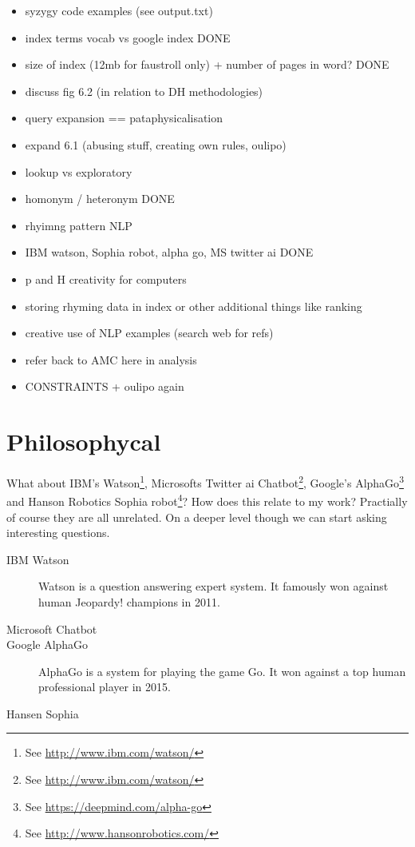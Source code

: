 \begin{itemize}
  \item syzygy code examples (see output.txt)
  \item index terms vocab vs google index DONE
  \item size of index (12mb for faustroll only) + number of pages in word? DONE
  \item discuss fig 6.2 (in relation to DH methodologies)
  \item query expansion == pataphysicalisation
  \item expand 6.1 (abusing stuff, creating own rules, oulipo)
  \item lookup vs exploratory
  \item homonym / heteronym DONE
  \item rhyimng pattern NLP
  \item IBM watson, Sophia robot, alpha go, MS twitter ai DONE
  \item p and H creativity for computers
  \item storing rhyming data in index or other additional things like ranking
  \item creative use of NLP examples (search web for refs)
  \item refer back to AMC here in analysis
  \item CONSTRAINTS + oulipo again
\end{itemize}


\section{Philosophycal}

What about IBM's Watson\footnote{See \url{http://www.ibm.com/watson/}}, Microsofts Twitter \gls{ai} Chatbot\footnote{See \url{http://www.ibm.com/watson/}}, Google's AlphaGo\footnote{See \url{https://deepmind.com/alpha-go}} and Hanson Robotics Sophia robot\footnote{See \url{http://www.hansonrobotics.com/}}? How does this relate to my work? Practially of course they are all unrelated. On a deeper level though we can start asking interesting questions. 

\begin{description}
  \item[IBM Watson] Watson is a question answering expert system. It famously won against human Jeopardy! champions in 2011.
  \item[Microsoft Chatbot] 
  \item[Google AlphaGo] AlphaGo is a system for playing the game Go. It won against a top human professional player in 2015.
  \item[Hansen Sophia]
\end{description}


